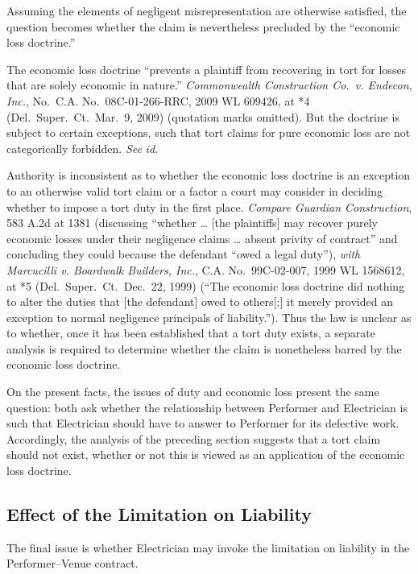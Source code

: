 \documentclass[
  12pt,
  letterpaper,
]{scrartcl}
\begin{document}
Assuming the elements of negligent misrepresentation are otherwise
satisfied, the question becomes whether the claim is nevertheless
precluded by the ``economic loss doctrine.''

The economic loss doctrine ``prevents a plaintiff from recovering in
tort for losses that are solely economic in nature.'' \emph{Commonwealth
Construction Co.~v. Endecon, Inc.}, No.~C.A. No.~08C-01-266-RRC, 2009 WL
609426, at *4 (Del.~Super.~Ct.~Mar.~9, 2009) (quotation marks
omitted). But the doctrine is subject to certain exceptions, such that
tort claims for pure economic loss are not categorically forbidden. \emph{See}
\emph{id.}

Authority is inconsistent as to whether the economic loss doctrine is an
exception to an otherwise valid tort claim or a factor a court may consider
in deciding whether to impose a tort duty in the first place.
\emph{Compare} \emph{Guardian Construction}, 583 A.2d at 1381
(discussing ``whether \ldots{} {[}the plaintiffs{]} may recover purely
economic losses under their negligence claims \ldots{} absent privity of
contract'' and concluding they could because the defendant ``owed a legal duty''), \emph{with} \emph{Marcucilli v. Boardwalk Builders, Inc.},
C.A. No.~99C-02-007, 1999 WL 1568612, at *5 (Del.~Super.~Ct.~Dec.~22,
1999) (``The economic loss doctrine did nothing to alter the duties that
{[}the defendant{]} owed to others{[};{]} it merely provided an
exception to normal negligence principals of liability.''). Thus the law
is unclear as to whether, once it has been established that a tort duty
exists, a separate analysis is required to determine whether the claim
is nonetheless barred by the economic loss doctrine.

On the present facts, the issues of duty and economic loss present the
same question: both ask whether the relationship between Performer and
Electrician is such that Electrician should have to answer to Performer
for its defective work. Accordingly, the analysis of the preceding
section suggests that a tort claim should not exist, whether or not this
is viewed as an application of the economic loss doctrine.

\hypertarget{effect-of-the-limitation-on-liability}{%
\subsection{Effect of the Limitation on
Liability}\label{effect-of-the-limitation-on-liability}}

The final issue is whether Electrician may invoke the limitation on
liability in the Performer--Venue contract.
\end{document}

